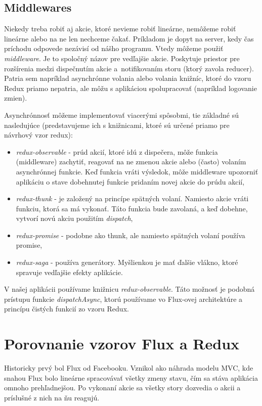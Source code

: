 \subsection{Middlewares}
\label{subsec:middlewares}
Niekedy treba robiť aj akcie, ktoré nevieme robiť lineárne, nemôžeme robiť lineárne alebo na ne len nechceme čakať. Príkladom je dopyt na server, kedy čas príchodu odpovede nezávisí od nášho programu. Vtedy môžeme použiť \emph{middleware}. Je to spoločný názov pre vedľajšie akcie. Poskytuje priestor pre rozšírenia medzi dispečnutím akcie a~notifikovaním storu (ktorý zavola reducer). Patria sem napríklad asynchrónne volania alebo volania knižníc, ktoré do vzoru Redux priamo nepatria, ale môžu s aplikáciou spolupracovať (napríklad logovanie zmien).

Asynchrónnosť môžeme implementovať viacerými spôsobmi, tie základné sú nasledujúce (predstavujeme ich s knižnicami, ktoré sú určené priamo pre návrhový vzor redux):
\begin{itemize}
  \item \emph{redux-observable} - prúd akcií, ktoré idú z dispečera, môže funkcia (middleware) zachytiť, reagovať na ne zmenou akcie alebo (často) volaním asynchrónnej funkcie. Keď funkcia vráti výsledok, môže middleware upozorniť aplikáciu o stave dobehnutej funkcie pridaním novej akcie do prúdu akcií,
  \item \emph{redux-thunk} - je založený na princípe spätných volaní. Namiesto akcie vráti funkciu, ktorá sa má vykonať. Táto funkcia bude zavolaná, a keď dobehne, vytvorí novú akciu použitím \emph{dispatch},
  \item \emph{redux-promise} - podobne ako thunk, ale namiesto spätných volaní používa promise,
  \item \emph{redux-saga} - používa generátory. Myšlienkou je mať ďalšie vlákno, ktoré spravuje vedľajšie efekty aplikácie.
\end{itemize}

V našej aplikácii používame knižnicu \emph{redux-observable}. Táto možnosť je podobná prístupu funkcie \emph{dispatchAsync}, ktorú používame vo Flux-ovej architektúre a princípu čistých funkcií zo vzoru Redux. 







\section{Porovnanie vzorov Flux a Redux}
Historicky prvý bol Flux od Facebooku. Vznikol ako náhrada modelu MVC, kde snahou Flux bolo lineárne spracovávať všetky zmeny stavu, čím sa stáva aplikácia omnoho prehľadnejšou. Po vykonaní akcie sa všetky story dozvedia o akcii a príslušné z nich na ňu reagujú.

